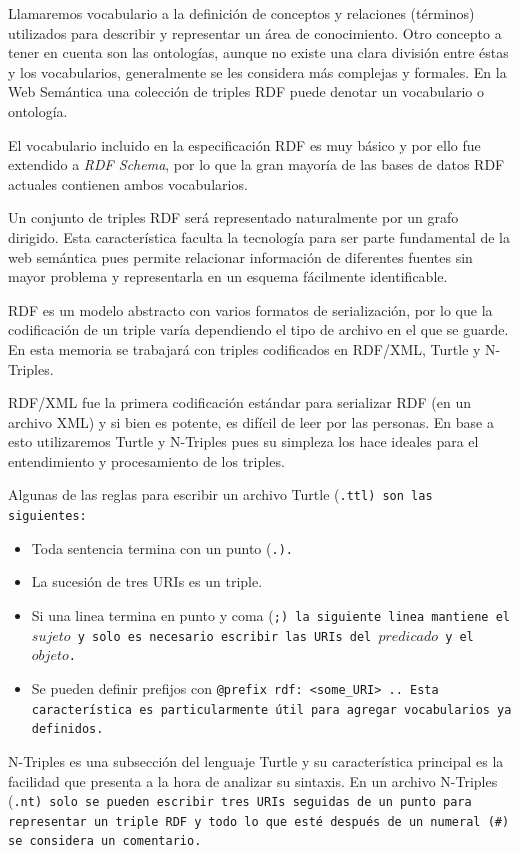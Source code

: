 Llamaremos vocabulario a la definición de conceptos y relaciones (términos)
utilizados para describir y representar un área de conocimiento.
Otro concepto a tener en cuenta son las ontologías, aunque no existe una clara 
división entre éstas y los vocabularios, generalmente se les considera más
complejas y formales.
En la Web Semántica una colección de triples RDF puede denotar un vocabulario o
ontología.

El vocabulario incluido en la especificación RDF es muy básico y por ello fue
extendido a \emph{RDF Schema}, por lo que la gran mayoría de las bases de datos
RDF actuales contienen ambos vocabularios.

Un conjunto de triples RDF será representado naturalmente por un grafo dirigido.
Esta característica faculta la tecnología para ser parte fundamental de la web 
semántica pues permite relacionar información de diferentes fuentes sin mayor
problema y representarla en un esquema fácilmente identificable.

RDF es un modelo abstracto con varios formatos de serialización, por lo que la
codificación de un triple varía dependiendo el tipo de archivo en el que se
guarde. En esta memoria se trabajará con triples codificados en RDF/XML,
Turtle\cite{beckett2014turtle} y N-Triples\cite{beckett2014nt}.

RDF/XML fue la primera codificación estándar para serializar RDF (en un archivo
XML) y si bien es potente, es difícil de leer por las personas. En base a esto
utilizaremos Turtle y N-Triples pues su simpleza los hace ideales para el
entendimiento y procesamiento de los triples.

Algunas de las reglas para escribir un archivo Turtle (\tt{.ttl}) son las
siguientes:
\begin{itemize}
  \item Toda sentencia termina con un punto (\tt{.}).
  \item La sucesión de tres URIs es un triple.
  \item 
    Si una linea termina en punto y coma (\tt{;}) la siguiente linea mantiene el
    $sujeto$ y solo es necesario escribir las URIs del $predicado$ y el
    $objeto$.
  \item 
    Se pueden definir prefijos con \tt{@prefix rdf: <some\_URI> .}. Esta
    característica es particularmente útil para agregar vocabularios ya
    definidos.
\end{itemize}

N-Triples es una subsección del lenguaje Turtle y su característica principal es
la facilidad que presenta a la hora de analizar su sintaxis. En un archivo
N-Triples (\tt{.nt}) solo se pueden escribir tres URIs seguidas de un punto para
representar un triple RDF y todo lo que esté después de un numeral (\tt{\#}) se
considera un comentario.


